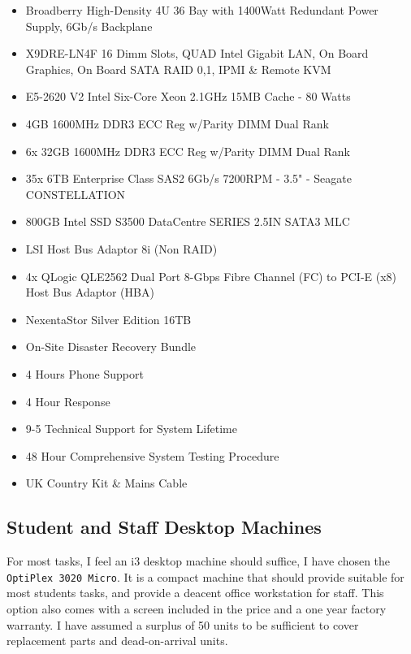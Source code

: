\documentclass[10pt]{article}
\begin{document}
                \begin{itemize}
                    \item Broadberry High-Density 4U 36 Bay with 1400Watt Redundant Power Supply, 6Gb/s Backplane
                    \item X9DRE-LN4F 16 Dimm Slots, QUAD Intel Gigabit LAN, On Board Graphics, On Board SATA RAID 0,1, IPMI \& Remote KVM
                    \item E5-2620 V2 Intel Six-Core Xeon 2.1GHz 15MB Cache - 80 Watts
                    \item 4GB 1600MHz DDR3 ECC Reg w/Parity DIMM Dual Rank
                    \item 6x 32GB 1600MHz DDR3 ECC Reg w/Parity DIMM Dual Rank
                    \item 35x 6TB Enterprise Class SAS2 6Gb/s 7200RPM - 3.5" - Seagate CONSTELLATION
                    \item 800GB Intel SSD S3500 DataCentre SERIES 2.5IN SATA3 MLC
                    \item LSI Host Bus Adaptor 8i (Non RAID)
                    \item 4x QLogic QLE2562 Dual Port 8-Gbps Fibre Channel (FC) to PCI-E (x8) Host Bus Adaptor (HBA)
                    \item NexentaStor Silver Edition 16TB
                    \item On-Site Disaster Recovery Bundle
                    \item 4 Hours Phone Support
                    \item 4 Hour Response
                    \item 9-5 Technical Support for System Lifetime
                    \item 48 Hour Comprehensive System Testing Procedure
                    \item UK Country Kit \& Mains Cable
                \end{itemize}


        \subsection{Student and Staff Desktop Machines}
            For most tasks, I feel an i3 desktop machine should suffice, I have chosen the \texttt{OptiPlex 3020 Micro}\cite{cite:3020micro}. It is a compact machine that should provide suitable for most students tasks, and provide a deacent office workstation for staff. This option also comes with a screen included in the price and a one year factory warranty. I have assumed a surplus of 50 units to be sufficient to cover replacement parts and dead-on-arrival units.
\end{document}
